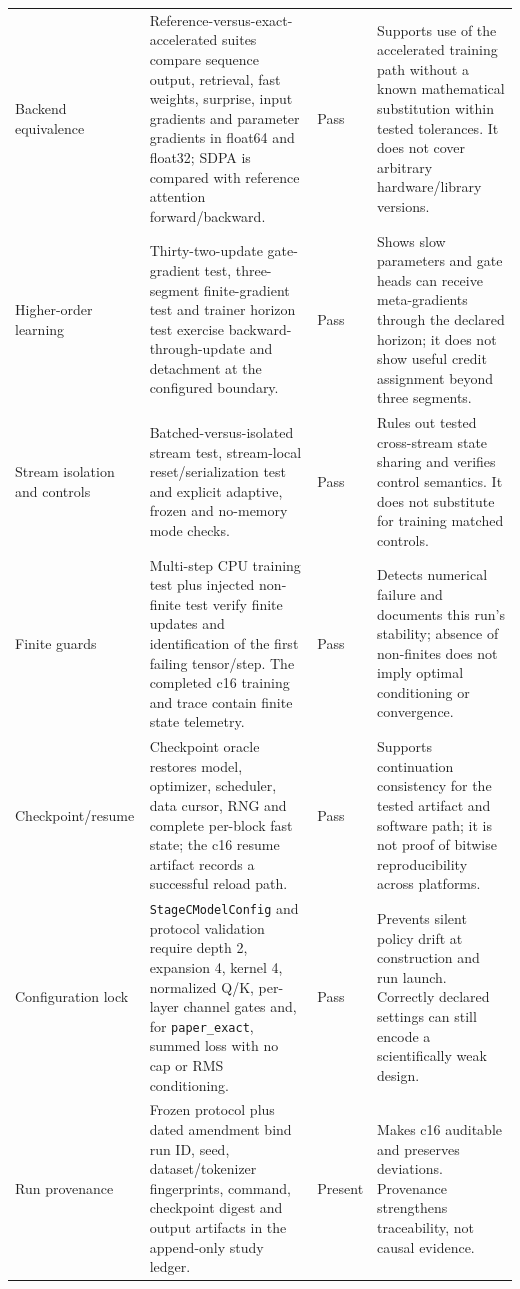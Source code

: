 \documentclass[10pt,twocolumn]{article}
\newcommand{\code}[1]{\texttt{#1}}
\begin{document}
\begin{table}[!t]
\begin{tabularx}{\textwidth}{@{}>{\raggedright\arraybackslash}p{}>{\raggedright\arraybackslash}p{}>{\centering\arraybackslash}p{}>{\raggedright\arraybackslash}X@{}}
Backend equivalence & Reference-versus-exact-accelerated suites compare sequence output, retrieval, fast weights, surprise, input gradients and parameter gradients in float64 and float32; SDPA is compared with reference attention forward/backward. & Pass & Supports use of the accelerated training path without a known mathematical substitution within tested tolerances. It does not cover arbitrary hardware/library versions.\\
Higher-order learning & Thirty-two-update gate-gradient test, three-segment finite-gradient test and trainer horizon test exercise backward-through-update and detachment at the configured boundary. & Pass & Shows slow parameters and gate heads can receive meta-gradients through the declared horizon; it does not show useful credit assignment beyond three segments.\\
Stream isolation and controls & Batched-versus-isolated stream test, stream-local reset/serialization test and explicit adaptive, frozen and no-memory mode checks. & Pass & Rules out tested cross-stream state sharing and verifies control semantics. It does not substitute for training matched controls.\\
Finite guards & Multi-step CPU training test plus injected non-finite test verify finite updates and identification of the first failing tensor/step. The completed c16 training and trace contain finite state telemetry. & Pass & Detects numerical failure and documents this run's stability; absence of non-finites does not imply optimal conditioning or convergence.\\
Checkpoint/resume & Checkpoint oracle restores model, optimizer, scheduler, data cursor, RNG and complete per-block fast state; the c16 resume artifact records a successful reload path. & Pass & Supports continuation consistency for the tested artifact and software path; it is not proof of bitwise reproducibility across platforms.\\
Configuration lock & \code{StageCModelConfig} and protocol validation require depth 2, expansion 4, kernel 4, normalized Q/K, per-layer channel gates and, for \code{paper\_exact}, summed loss with no cap or RMS conditioning. & Pass & Prevents silent policy drift at construction and run launch. Correctly declared settings can still encode a scientifically weak design.\\
Run provenance & Frozen protocol plus dated amendment bind run ID, seed, dataset/tokenizer fingerprints, command, checkpoint digest and output artifacts in the append-only study ledger. & Present & Makes c16 auditable and preserves deviations. Provenance strengthens traceability, not causal evidence.\\

\end{tabularx}
\end{table}
\end{document}
